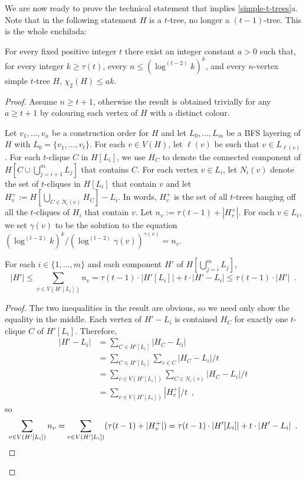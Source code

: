 \documentclass[kpfonts]{patmorin}
\newcommand{\trn}{\chi_2}
\theoremstyle{named}
\newcommand{\weirdref}[2]{\cref{#1}#2}
\begin{document}
We are now ready to prove the technical statement that implies \weirdref{simple-t-trees}{a}. Note that in the following statement $H$ is a $t$-tree, no longer a $(t-1)$-tree.  This is the whole enchilada:


\begin{lem}\label{two-tree-technical}
    For every fixed positive integer $t$ there exist an integer constant $a>0$ such that, for every integer $k\ge \tau(t)$, every $n\le (\log^{(t-2)} k)^{k}$, and every $n$-vertex simple $t$-tree $H$, $\trn(H)\le ak$.
\end{lem}

\begin{proof}
    Assume $n\ge t+1$, otherwise the result is obtained trivially for any $a\ge t+1$ by colouring each vertex of $H$ with a distinct colour.

    Let $v_1,\ldots,v_n$ be a construction order for $H$ and let $L_0,\ldots,L_m$ be a BFS layering of $H$ with $L_0=\{v_1,\ldots,v_{t}\}$.
    For each $v\in V(H)$, let $\ell(v)$ be such that $v\in L_{\ell(v)}$.
    For each $t$-clique $C$ in $H[L_i]$, we use $H_C$ to denote the connected component of $H[C\cup\bigcup_{j=i+1}^m L_j]$ that contains $C$.
    For each vertex $v\in L_i$, let $N_i(v)$ denote the set of $t$-cliques in $H[L_i]$ that contain $v$ and let $H^+_v:=H[\bigcup_{C\in N_i(v)} H_C]-L_i$.  In words, $H^+_v$ is the set of all $t$-trees hanging off all the $t$-cliques of $H_i$ that contain $v$.  Let $n_v:=\tau(t-1)+|H^+_v|$.  For each $v\in L_i$, we set $\gamma(v)$ to be the solution to the equation $(\log^{(t-2)} k)^k/(\log^{(t-2)} \gamma(v))^{\gamma(v)} = n_v$.

    \begin{clm}\label{size-claim}
        For each $i\in\{1,\ldots,m\}$ and each component $H'$ of $H[\bigcup_{j=i}^m L_j]$,
        \[
            |H'| \le \sum_{v\in V(H'[L_i])} n_v = \tau(t-1)\cdot|H'[L_i] |+ t\cdot|H'-L_i|
            \le \tau(t-1)\cdot|H'| \enspace .
        \]
    \end{clm}

    \begin{proof}
        The two inequalities in the result are obvious, so we need only show the equality in the middle.
        Each vertex of $H'-L_i$ is contained $H_C$ for exactly one $t$-clique $C$ of $H'[L_i]$.  Therefore,
        \begin{align*}
            |H'-L_i|
            & = \sum_{C\in H'[L_i]} |H_C-L_i| \\
            & = \sum_{C\in H'[L_i]}\sum_{v\in C} |H_C-L_i|/t \\
            & = \sum_{v\in V(H'[L_i])}\sum_{C\in N_i(v)} |H_C-L_i|/t \\
            & = \sum_{v\in V(H'[L_i])}|H^+_v|/t \enspace ,
        \end{align*}
        so
        \[  \sum_{v\in V(H'[L_i])} n_v = \sum_{v\in V(H'[L_i])}(\tau(t-1)+|H^+_v|)
          = \tau(t-1)\cdot|H'[L_i]| + t\cdot|H'-L_i| \enspace . \qedhere
        \]
    \end{proof}


\end{proof}
\end{document}

